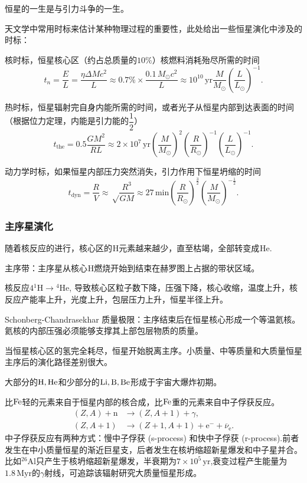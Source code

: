 \documentclass[../天体物理基础.tex]{subfiles}
\begin{document}
恒星的一生是与引力斗争的一生。

天文学中常用时标来估计某种物理过程的重要性，此处给出一些恒星演化中涉及的时标：

核时标，恒星核心区（约占总质量的$10\%$）核燃料消耗殆尽所需的时间
\begin{equation}
t_{n}=\frac{E}{L}=\frac{\eta\Delta{}Mc^{2}}{L}\approx0.7\%\times\frac{0.1\,M_{\odot}c^{2}}{L}\approx10^{10}\,\mathrm{yr}\frac{M}{M_{\odot}}\left(\frac{L}{L_{\odot}}\right)^{-1}.
\end{equation}

热时标，恒星辐射完自身内能所需的时间，或者光子从恒星内部到达表面的时间（根据位力定理，内能是引力能的$\dfrac{1}{2}$）
\begin{equation}
t_{\text{the}}=0.5\frac{GM^{2}}{RL}\approx2\times10^{7}\,\mathrm{yr}\left(\frac{M}{M_{\odot}}\right)^{2}\left(\frac{R}{R_{\odot}}\right)^{-1}\left(\frac{L}{L_{\odot}}\right)^{-1}.
\end{equation}

动力学时标，如果恒星内部压力突然消失，引力作用下恒星坍缩的时间
\begin{equation}
t_{\text{dyn}}=\frac{R}{V}\approx\sqrt\frac{R^{3}}{GM}\approx27\,\mathrm{min}\left(\frac{R}{R_{\odot}}\right)^{\frac{3}{2}}\left(\frac{M}{M_{\odot}}\right)^{-\frac{1}{2}}.
\end{equation}

\subsubsection{主序星演化}
随着核反应的进行，核心区的${}^{}\mathrm{H}$元素越来越少，直至枯竭，全部转变成${}^{}\mathrm{He}$.

主序带：主序星从核心${}^{}\mathrm{H}$燃烧开始到结束在赫罗图上占据的带状区域。

核反应$4{}^{1}\mathrm{H}\to{}^{4}\mathrm{He}$, 导致核心区粒子数下降，压强下降，核心收缩，温度上升，核反应产能率上升，光度上升，包层压力上升，恒星半径上升。

Schonberg-Chandrasekhar 质量极限：主序结束后在恒星核心形成一个等温氦核。氦核的内部压强必须能够支撑其上部包层物质的质量。

当恒星核心区的氢完全耗尽，恒星开始脱离主序。小质量、中等质量和大质量恒星主序后的演化路径差别很大。

大部分的$\rm H,He$和少部分的$\rm Li,B,Be$形成于宇宙大爆炸初期。

比$\rm Fe$轻的元素来自于恒星内部的核合成，比$\rm Fe$重的元素来自中子俘获反应。
\begin{align}
\left(Z,A\right)+\mathrm{n}&\to\left(Z,A+1\right)+\gamma,\\
\left(Z,A+1\right)&\to\left(Z+1,A+1\right)+\mathrm{e}^{-}+\overline{\nu}_{\text{e}}.
\end{align}
中子俘获反应有两种方式：慢中子俘获 (s-process) 和快中子俘获 (r-process).前者发生在中小质量恒星的渐近巨星支，后者发生在核坍缩超新星爆发和中子星并合。比如${}^{26}\mathrm{Al}$只产生于核坍缩超新星爆发，半衰期为$7\times10^{5}\,\mathrm{yr}$,衰变过程产生能量为$1.8\,\mathrm{Myr}$的$\gamma$射线，可追踪该辐射研究大质量恒星形成。
\end{document}
